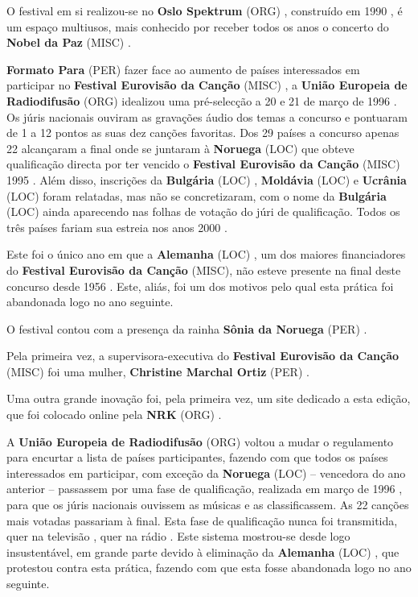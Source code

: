 \documentclass[12pt,a4paper]{article}
\begin{document}
O festival em si realizou-se no \textbf{Oslo Spektrum} (ORG) , construído em 1990 , é um espaço multiusos, mais conhecido por receber todos os anos o concerto do \textbf{Nobel da Paz} (MISC) .



\textbf{Formato Para} (PER) fazer face ao aumento de países interessados em participar no \textbf{Festival Eurovisão da Canção} (MISC) , a \textbf{União Europeia de Radiodifusão} (ORG) idealizou uma pré-selecção a 20 e 21 de março de 1996 . Os júris nacionais ouviram as gravações áudio dos temas a concurso e pontuaram de 1 a 12 pontos as suas dez canções favoritas. Dos 29 países a concurso apenas 22 alcançaram a final onde se juntaram à \textbf{Noruega} (LOC) que obteve qualificação directa por ter vencido o \textbf{Festival Eurovisão da Canção} (MISC) 1995 . Além disso, inscrições da \textbf{Bulgária} (LOC) , \textbf{Moldávia} (LOC) e \textbf{Ucrânia} (LOC) foram relatadas, mas não se concretizaram, com o nome da \textbf{Bulgária} (LOC) ainda aparecendo nas folhas de votação do júri de qualificação. Todos os três países fariam sua estreia nos anos 2000 .

Este foi o único ano em que a \textbf{Alemanha} (LOC) , um dos maiores financiadores do \textbf{Festival Eurovisão da Canção} (MISC), não esteve presente na final deste concurso desde 1956 . Este, aliás, foi um dos motivos pelo qual esta prática foi abandonada logo no ano seguinte.

O festival contou com a presença da rainha \textbf{Sônia da Noruega} (PER) .

Pela primeira vez, a supervisora-executiva do \textbf{Festival Eurovisão da Canção} (MISC) foi uma mulher, \textbf{Christine Marchal Ortiz} (PER) .

Uma outra grande inovação foi, pela primeira vez, um site dedicado a esta edição, que foi colocado online pela \textbf{NRK} (ORG) .

A \textbf{União Europeia de Radiodifusão} (ORG) voltou a mudar o regulamento para encurtar a lista de países participantes, fazendo com que todos os países interessados em participar, com exceção da \textbf{Noruega} (LOC) -- vencedora do ano anterior -- passassem por uma fase de qualificação, realizada em março de 1996 , para que os júris nacionais ouvissem as músicas e as classificassem. As 22 canções mais votadas passariam à final. Esta fase de qualificação nunca foi transmitida, quer na televisão , quer na rádio . Este sistema mostrou-se desde logo insustentável, em grande parte devido à eliminação da \textbf{Alemanha} (LOC) , que protestou contra esta prática, fazendo com que esta fosse abandonada logo no ano seguinte.
\end{document}
